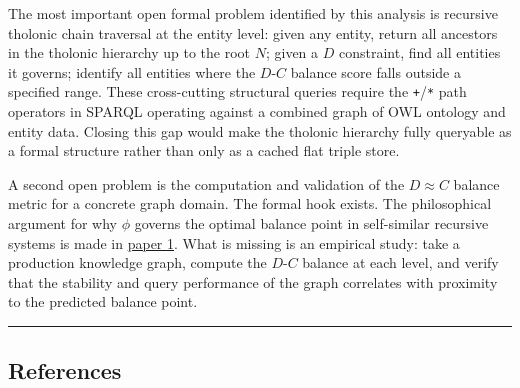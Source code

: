 \documentclass[
  11pt,
  letterpaper,
]{article}
\begin{document}
The most important open formal problem identified by this analysis is
recursive tholonic chain traversal at the entity level: given any
entity, return all ancestors in the tholonic hierarchy up to the root
\(N\); given a \(D\) constraint, find all entities it governs; identify
all entities where the \(D\)-\(C\) balance score falls outside a
specified range. These cross-cutting structural queries require the
\texttt{+}/\texttt{*} path operators in SPARQL operating against a
combined graph of OWL ontology and entity data. Closing this gap would
make the tholonic hierarchy fully queryable as a formal structure rather
than only as a cached flat triple store.

A second open problem is the computation and validation of the
\(D \approx C\) balance metric for a concrete graph domain. The formal
hook exists. The philosophical argument for why \(\phi\) governs the
optimal balance point in self-similar recursive systems is made in
\href{https://github.com/baardev/truevalue/blob/main/docnav/Research/papers/1_recursive-tholonic-five-constants/1_recursive-tholonic-five-constants.pdf}{paper
1}. What is missing is an empirical study: take a production knowledge
graph, compute the \(D\)-\(C\) balance at each level, and verify that
the stability and query performance of the graph correlates with
proximity to the predicted balance point.

\begin{center}\rule{0.5\linewidth}{0.5pt}\end{center}

\subsection{References}\label{references}
\end{document}
